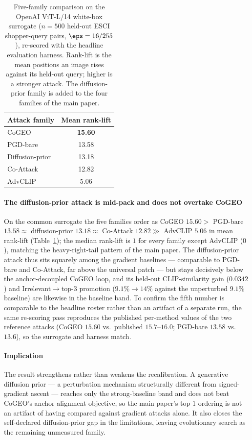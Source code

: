\begin{table}[t]
\centering
\caption{Five-family comparison on the OpenAI ViT-L/14 white-box surrogate ($n = 500$ held-out ESCI shopper-query pairs, $\eps = 16/255$), re-scored with the headline evaluation harness. Rank-lift is the mean positions an image rises against its held-out query; higher is a stronger attack. The diffusion-prior family is added to the four families of the main paper.}
\label{sm:tab:diffprior}
\small
\begin{tabular}{lc}
\toprule
Attack family & Mean rank-lift \\
\midrule
CoGEO & \textbf{15.60} \\
PGD-bare & 13.58 \\
Diffusion-prior~\cite{rombach2022ldm} & 13.18 \\
Co-Attack & 12.82 \\
AdvCLIP & 5.06 \\
\bottomrule
\end{tabular}
\end{table}

\paragraph{The diffusion-prior attack is mid-pack and does not overtake CoGEO} On the common surrogate the five families order as CoGEO $15.60 >$ PGD-bare $13.58 \approx$ diffusion-prior $13.18 \approx$ Co-Attack $12.82 \gg$ AdvCLIP $5.06$ in mean rank-lift (Table~\ref{sm:tab:diffprior}); the median rank-lift is $1$ for every family except AdvCLIP ($0$), matching the heavy-right-tail pattern of the main paper. The diffusion-prior attack thus sits squarely among the gradient baselines --- comparable to PGD-bare and Co-Attack, far above the universal patch --- but stays decisively below the anchor-decoupled CoGEO loop, and its held-out CLIP-similarity gain ($0.0342$) and Irrelevant$\to$top-$3$ promotion ($9.1\% \to 14\%$ against the unperturbed $9.1\%$ baseline) are likewise in the baseline band. To confirm the fifth number is comparable to the headline roster rather than an artifact of a separate run, the same re-scoring pass reproduces the published per-method values of the two reference attacks (CoGEO $15.60$ vs.\ published $15.7$--$16.0$; PGD-bare $13.58$ vs.\ $13.6$), so the surrogate and harness match.

\paragraph{Implication} The result strengthens rather than weakens the recalibration. A generative diffusion prior --- a perturbation mechanism structurally different from signed-gradient ascent --- reaches only the strong-baseline band and does not beat CoGEO's anchor-alignment objective, so the main paper's top-$1$ ordering is not an artifact of having compared against gradient attacks alone. It also closes the self-declared diffusion-prior gap in the limitations, leaving evolutionary search as the remaining unmeasured family.

